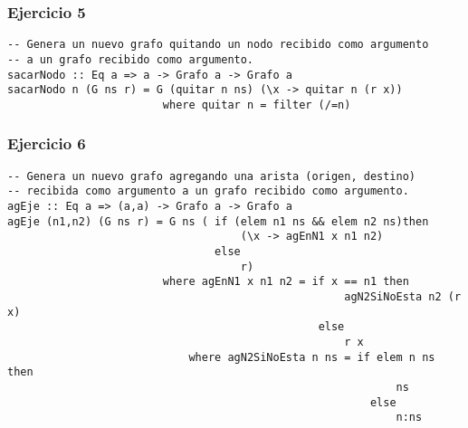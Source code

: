 \subsubsection*{Ejercicio 5}
\begin{lstlisting}
-- Genera un nuevo grafo quitando un nodo recibido como argumento
-- a un grafo recibido como argumento.
sacarNodo :: Eq a => a -> Grafo a -> Grafo a
sacarNodo n (G ns r) = G (quitar n ns) (\x -> quitar n (r x))
						where quitar n = filter (/=n)

\end{lstlisting}
\vspace{1cm}

\subsubsection*{Ejercicio 6}
\begin{lstlisting}
-- Genera un nuevo grafo agregando una arista (origen, destino) 
-- recibida como argumento a un grafo recibido como argumento.
agEje :: Eq a => (a,a) -> Grafo a -> Grafo a
agEje (n1,n2) (G ns r) = G ns ( if (elem n1 ns && elem n2 ns)then 
									(\x -> agEnN1 x n1 n2) 
								else 
									r)
						where agEnN1 x n1 n2 = if x == n1 then 
													agN2SiNoEsta n2 (r x) 
												else 
													r x
							where agN2SiNoEsta n ns = if elem n ns then 
															ns 
														else 
															n:ns

\end{lstlisting}
\vspace{1cm}

